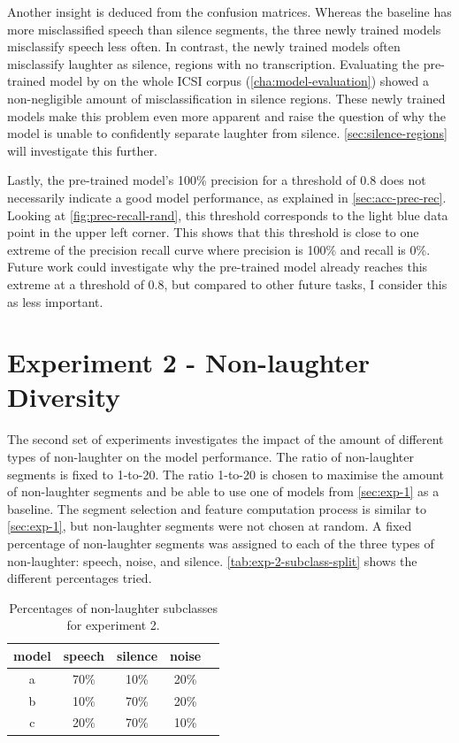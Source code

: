 \documentclass[bsc,frontabs,parskip,deptreport]{infthesis}
\begin{document}
Another insight is deduced from the confusion matrices. Whereas the baseline has more misclassified speech than silence segments, the three newly trained models misclassify speech less often. 
In contrast, the newly trained models often misclassify laughter as silence, regions with no transcription.
Evaluating the pre-trained model by \citet{gillick2021robust} on the whole ICSI corpus (\autoref{cha:model-evaluation}) showed a non-negligible amount of misclassification in silence regions. 
These newly trained models make this problem even more apparent and raise the question of why the model is unable to confidently separate laughter from silence. \autoref{sec:silence-regions} will investigate this further.

Lastly, the pre-trained model's 100\% precision for a threshold of 0.8 does not necessarily indicate a good model performance, as explained in \autoref{sec:acc-prec-rec}. Looking at \autoref{fig:prec-recall-rand}, this threshold corresponds to the light blue data point in the upper left corner. This shows that this threshold is close to one extreme of the precision recall curve where precision is 100\% and recall is 0\%. Future work could investigate why the pre-trained model already reaches this extreme at a threshold of 0.8, but compared to other future tasks, I consider this as less important.

\section{Experiment 2 - Non-laughter Diversity} \label{sec:exp2}
The second set of experiments investigates the impact of the amount of different types of non-laughter on the model performance. 
The ratio of non-laughter segments is fixed to 1-to-20. The ratio 1-to-20 is chosen to maximise the amount of non-laughter segments and be able to use one of models from \autoref{sec:exp-1} as a baseline.
The segment selection and feature computation process is similar to \autoref{sec:exp-1}, but non-laughter segments were not chosen at random. A fixed percentage of non-laughter segments was assigned to each of the three types of non-laughter: speech, noise, and silence.
\autoref{tab:exp-2-subclass-split} shows the different percentages tried.

\begin{table}[h!]
    \centering
    \begin{tabular}{|c|c|c|c|c|}
        \hline
        model & speech & silence & noise \\
        \hline
        a &  70\% & 10\% & 20\% \\
        b &  10\%  & 70\% &  20\%\\
        c &  20\%  & 70\% & 10\% \\ 
        \hline
    \end{tabular}
    \caption{Percentages of non-laughter subclasses for experiment 2.}
    \label{tab:exp-2-subclass-split}
\end{table}
\end{document}
